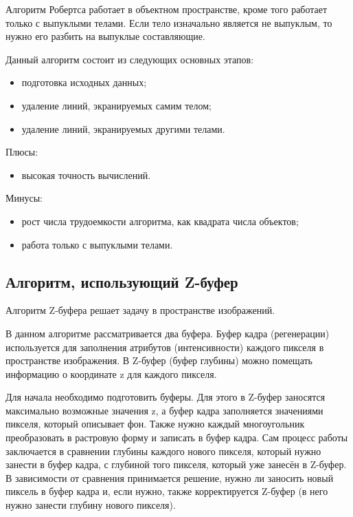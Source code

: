 Алгоритм Робертса работает в объектном пространстве, кроме того работает только с выпуклыми телами. Если тело изначально является не выпуклым, то нужно его разбить на выпуклые составляющие.

Данный алгоритм состоит из следующих основных этапов:

\begin{itemize}
	\item подготовка исходных данных;
	\item удаление линий, экранируемых самим телом;
	\item удаление линий, экранируемых другими телами.
\end{itemize}

Плюсы:

\begin{itemize}
	\item высокая точность вычислений.
\end{itemize}

Минусы:

\begin{itemize}
	\item рост числа трудоемкости алгоритма, как квадрата числа объектов;
	\item работа только с выпуклыми телами.
\end{itemize}

\subsection{Алгоритм, использующий Z-буфер}

Алгоритм Z-буфера решает задачу в пространстве изображений. 

В данном алгоритме рассматривается два буфера. Буфер кадра (регенерации) используется для заполнения атрибутов (интенсивности) каждого пикселя в пространстве изображения. В Z-буфер (буфер глубины) можно помещать информацию о координате z для каждого пикселя.

Для начала необходимо подготовить буферы. Для этого в Z-буфер заносятся максимально возможные значения z, а буфер кадра заполняется значениями пикселя, который описывает фон. Также нужно каждый многоугольник преобразовать в растровую форму и записать в буфер кадра. Сам процесс работы заключается в сравнении глубины каждого нового пикселя, который нужно занести в буфер кадра,
с глубиной того пикселя, который уже занесён в Z-буфер. В зависимости от сравнения принимается решение, нужно ли заносить новый пиксель в буфер кадра и, если нужно, также корректируется Z-буфер (в него нужно занести глубину нового пикселя).

